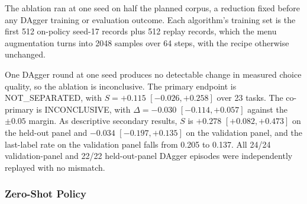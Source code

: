 The ablation ran at one seed on half the planned corpus, a reduction fixed before any DAgger training or evaluation outcome. Each algorithm's training set is the first 512 on-policy seed-17 records plus 512 replay records, which the menu augmentation turns into 2048 samples over 64 steps, with the recipe otherwise unchanged.

One DAgger round at one seed produces no detectable change in measured choice quality, so the ablation is inconclusive. The primary endpoint is NOT\_SEPARATED, with $S = +0.115$ $[-0.026, +0.258]$ over 23 tasks. The co-primary is INCONCLUSIVE, with $\Delta = -0.030$ $[-0.114, +0.057]$ against the $\pm 0.05$ margin. As descriptive secondary results, $S$ is $+0.278$ $[+0.082, +0.473]$ on the held-out panel and $-0.034$ $[-0.197, +0.135]$ on the validation panel, and the last-label rate on the validation panel falls from 0.205 to 0.137. All 24/24 validation-panel and 22/22 held-out-panel DAgger episodes were independently replayed with no mismatch.

\subsubsection{Zero-Shot Policy}
\label{app:results-cf-zeroshot}

